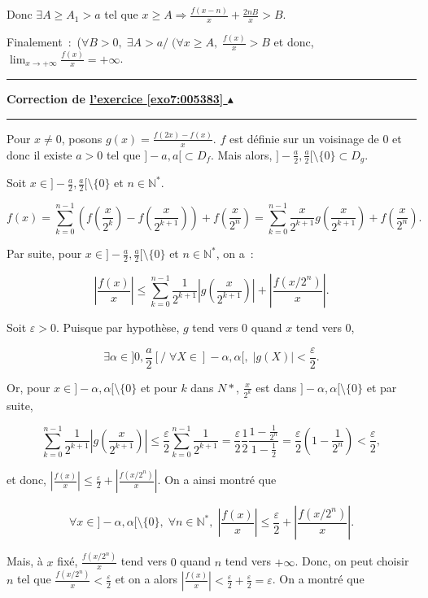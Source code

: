 \documentclass[11pt,a4paper]{article}
\newcommand{\Nn}{\mathbb{N}} \newcommand{\N}{\mathbb{N}}
\newcounter{exo}
\newcommand{\correction}[1]{\hypertarget{cor7:#1}{}\label{cor7:#1}{\bf Correction de \hyperlink{exo7:#1}{l'exercice \ref{exo7:#1} $\blacktriangle$}}\vspace{1mm}\hrule\vspace{1mm}}
\newcommand{\fincorrection}{\vspace{1mm}\hrule\vspace*{7mm}}
\begin{document}
Donc $\exists A\geq A_1>a$ tel que $x\geq A\Rightarrow\frac{f(x-n)}{x}+\frac{2nB}{x}>B$.

Finalement~:~($\forall B>0,\;\exists A>a/\;(\forall x\geq A,\;\frac{f(x)}{x}>B$ et donc, $\lim_{x\rightarrow +\infty}\frac{f(x)}{x}=+\infty$.

\fincorrection
\correction{005383}
Pour $x\neq 0$, posons $g(x)=\frac{f(2x)-f(x)}{x}$. $f$ est définie sur un voisinage de $0$ et donc il existe $a>0$ tel que $]-a,a[\subset D_f$. Mais alors, $]-\frac{a}{2},\frac{a}{2}[\setminus\{0\}\subset D_g$.

Soit $x\in]-\frac{a}{2},\frac{a}{2}[\setminus\{0\}$ et $n\in\Nn^*$.

$$f(x)=\sum_{k=0}^{n-1}(f(\frac{x}{2^k})-f(\frac{x}{2^{k+1}}))+f(\frac{x}{2^n})=\sum_{k=0}^{n-1}\frac{x}{2^{k+1}}g(\frac{x}{2^{k+1}})+f(\frac{x}{2^n}).$$

Par suite, pour $x\in]-\frac{a}{2},\frac{a}{2}[\setminus\{0\}$ et $n\in\Nn^*$, on a~:

$$\left|\frac{f(x)}{x}\right|\leq\sum_{k=0}^{n-1}\frac{1}{2^{k+1}}\left|g(\frac{x}{2^{k+1}})\right|+\left|\frac{f(x/2^n)}{x}\right|.$$

Soit $\varepsilon>0$. Puisque par hypothèse, $g$ tend vers $0$ quand $x$ tend vers $0$,

$$\exists\alpha\in]0,\frac{a}{2}[/\;\forall X\in]-\alpha,\alpha[,\;|g(X)|<\frac{\varepsilon}{2}.$$

Or, pour $x\in]-\alpha,\alpha[\setminus\{0\}$ et pour $k$ dans $N*$, $\frac{x}{2^k}$ est dans $]-\alpha,\alpha[\setminus\{0\}$ et par suite,

$$\sum_{k=0}^{n-1}\frac{1}{2^{k+1}}\left|g(\frac{x}{2^{k+1}})\right|\leq\frac{\varepsilon}{2}\sum_{k=0}^{n-1}\frac{1}{2^{k+1}}=\frac{\varepsilon}{2}\frac{1}{2}\frac{1-\frac{1}{2^n}}{1-\frac{1}{2}}=\frac{\varepsilon}{2}(1-\frac{1}{2^n})<\frac{\varepsilon}{2},$$

et donc, $\left|\frac{f(x)}{x}\right|\leq\frac{\varepsilon}{2}+\left|\frac{f(x/2^n)}{x}\right|$. On a ainsi montré que 

$$\forall x\in]-\alpha,\alpha[\setminus\{0\},\;\forall n\in\Nn^*,\;\left|\frac{f(x)}{x}\right|\leq\frac{\varepsilon}{2}+\left|\frac{f(x/2^n)}{x}\right|.$$

Mais, à $x$ fixé, $\frac{f(x/2^n)}{x}$ tend vers $0$ quand $n$ tend vers $+\infty$. Donc, on peut choisir $n$ tel que  $\frac{f(x/2^n)}{x}<\frac{\varepsilon}{2}$ et on a alors  $\left|\frac{f(x)}{x}\right|<\frac{\varepsilon}{2}+\frac{\varepsilon}{2}=\varepsilon$. On a montré que 
\end{document}

